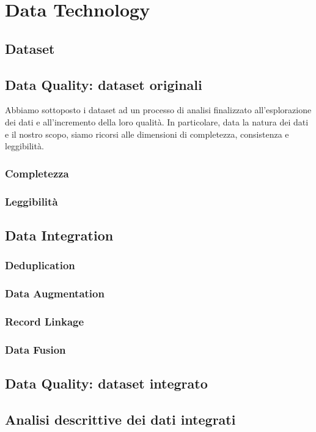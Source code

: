 \setcounter{chapter}{0}

\part{Data Technology}

\chapter{Dataset}

\chapter{Data Quality: dataset originali}
\label{chap:data-quality}
Abbiamo sottoposto i dataset ad un processo di analisi finalizzato 
all'esplorazione dei dati e all'incremento della loro qualità. In particolare, 
data la natura dei dati e il nostro scopo, siamo ricorsi alle dimensioni di 
completezza, consistenza e leggibilità.


\section{Completezza}

\section{Leggibilità}

\chapter{Data Integration}
\label{chap:data-integration}

\section{Deduplication}

\section{Data Augmentation}

\section{Record Linkage}
\label{sec:record-linkage}

\section{Data Fusion}
\label{sec:data-fusion}

\chapter{Data Quality: dataset integrato}

\chapter{Analisi descrittive dei dati integrati}
